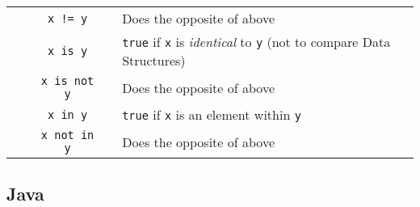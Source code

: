 \documentclass{article}
\begin{document}
\begin{center}
\begin{tabularx}{\textwidth}{clccX}
                      & & \lstinline|x != y|    &  & Does the opposite of above\\
                      & & \lstinline|x is y| & & \lstinline|true| if \lstinline|x| is \textit{identical} to \lstinline|y| (not to compare Data Structures)\\
                      & & \lstinline|x is not y| & & Does the opposite of above\\
                      & & \lstinline|x in y| & & \lstinline|true| if \lstinline|x| is an element within \lstinline|y|\\
                      & & \lstinline|x not in y| & & Does the opposite of above\\\midrule
\end{tabularx}\end{center}
\subsection{Java}
\end{document}
